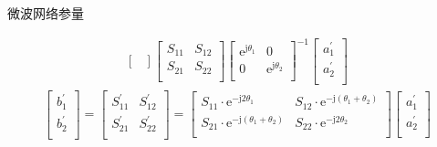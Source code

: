 \begin{frame}{微波网络参量}
\begin{enumerate}
\begin{align*}
\begin{bmatrix*}
                  \end{bmatrix*}
                  \begin{bmatrix*}
                      S_{11} & S_{12} \\
                      S_{21} & S_{22} \\
                  \end{bmatrix*}
                  \begin{bmatrix*}
                      \mathrm{e}^{\mathrm{j}\theta_1} & 0 \\
                      0 & \mathrm{e}^{\mathrm{j}\theta_2} \\
                  \end{bmatrix*}^{-1}
                  \begin{bmatrix*}
                      a_1^{'} \\
                      a_2^{'} \\
                  \end{bmatrix*}
              \end{align*}
              \begin{align*}
                  \begin{bmatrix*}
                      b_1^{'} \\
                      b_2^{'} \\
                  \end{bmatrix*}
                  =
                  \begin{bmatrix*}
                      S_{11}^{'} & S_{12}^{'} \\
                      S_{21}^{'} & S_{22}^{'} \\
                  \end{bmatrix*}
                  =
                  \begin{bmatrix*}
                      S_{11}\cdot\mathrm{e}^{-\mathrm{j}2\theta_1} & S_{12}\cdot\mathrm{e}^{-\mathrm{j}(\theta_1+\theta_2)} \\
                      S_{21}\cdot\mathrm{e}^{-\mathrm{j}(\theta_1+\theta_2)} & S_{22}\cdot \mathrm{e}^{-\mathrm{j}2\theta_2} \\
                  \end{bmatrix*}
                  \begin{bmatrix*}
                      a_1^{'} \\
                      a_2^{'} \\
                  \end{bmatrix*}
              \end{align*}
    \end{enumerate}
\end{frame}

